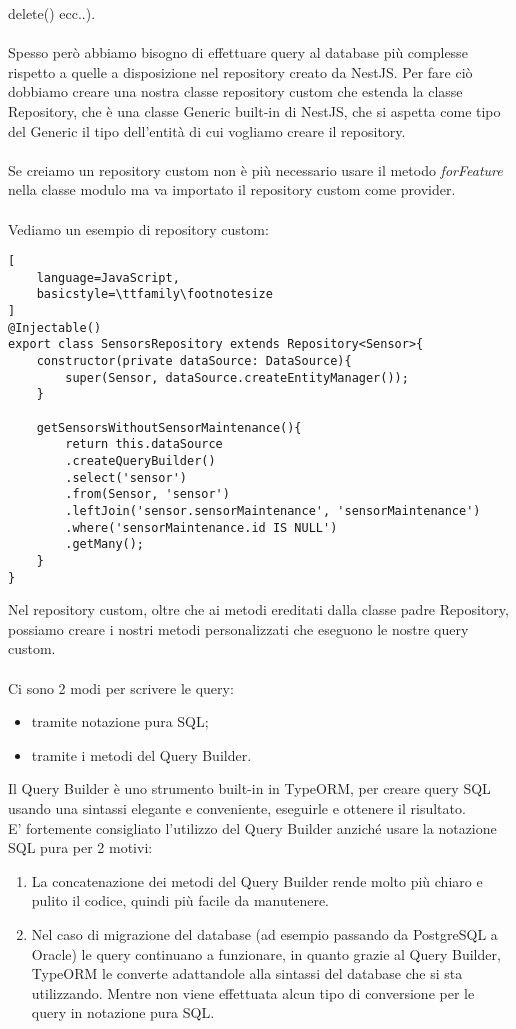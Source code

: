 delete() ecc..).
\\\\
Spesso però abbiamo bisogno di effettuare query al database più complesse rispetto a quelle a disposizione nel repository
creato da NestJS. Per fare ciò dobbiamo creare una nostra classe repository custom che estenda la classe Repository, che è una
classe Generic built-in di NestJS, che si aspetta come tipo del Generic il tipo dell'entità di cui vogliamo 
creare il repository.
\\\\
Se creiamo un repository custom non è più necessario usare il metodo \textit{forFeature} nella classe modulo ma va importato il repository custom
come provider.
\\\\ 
Vediamo un esempio di repository custom:
\begin{lstlisting}[
    language=JavaScript,
    basicstyle=\ttfamily\footnotesize
]
@Injectable()
export class SensorsRepository extends Repository<Sensor>{
    constructor(private dataSource: DataSource){
        super(Sensor, dataSource.createEntityManager());
    }

    getSensorsWithoutSensorMaintenance(){
        return this.dataSource
        .createQueryBuilder()
        .select('sensor')
        .from(Sensor, 'sensor')
        .leftJoin('sensor.sensorMaintenance', 'sensorMaintenance')
        .where('sensorMaintenance.id IS NULL')
        .getMany();
    }
}
\end{lstlisting}
\leavevmode\newline
Nel repository custom, oltre che ai metodi ereditati dalla classe padre Repository, possiamo creare i nostri metodi personalizzati
che eseguono le nostre query custom. 
\\\\
Ci sono 2 modi per scrivere le query:
\begin{itemize}
    \item tramite notazione pura SQL;
    \item tramite i metodi del Query Builder.
\end{itemize}
\leavevmode\newline
Il Query Builder è uno strumento built-in in TypeORM, per creare query SQL usando una sintassi elegante e conveniente,
eseguirle e ottenere il risultato.
\\
E' fortemente consigliato l'utilizzo del Query Builder anziché usare la notazione SQL pura per 2 motivi:
\begin{enumerate}
    \item La concatenazione dei metodi del Query Builder rende molto più chiaro e pulito il codice, quindi più facile
        da manutenere.
    \item Nel caso di migrazione del database (ad esempio passando da PostgreSQL a Oracle) le query continuano a funzionare, in 
        quanto grazie al Query Builder,
        TypeORM le converte adattandole alla sintassi del database che si sta utilizzando. Mentre non viene 
        effettuata alcun tipo di conversione per le query in notazione pura SQL.
\end{enumerate}
